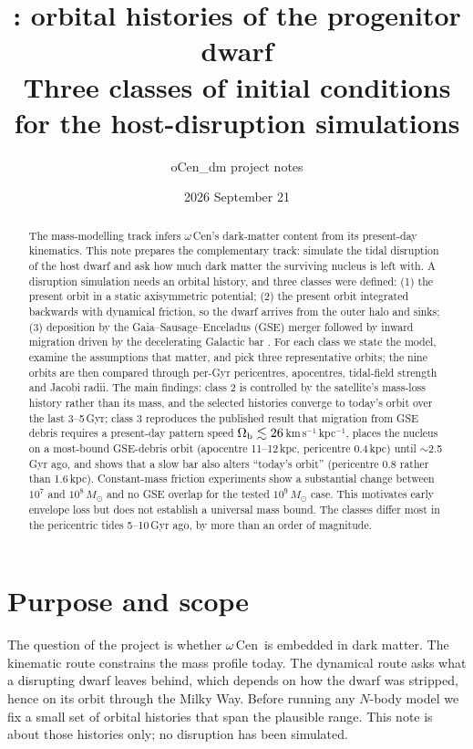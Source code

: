 \documentclass[11pt,a4paper]{article}
\title{\ocen: orbital histories of the progenitor dwarf\\ \large Three classes of initial conditions for the host-disruption simulations}
\author{oCen\_dm project notes}
\date{2026 September 21}
\newcommand{\kmskpc}{km\,s$^{-1}$\,kpc$^{-1}$}
\newcommand{\ocen}{$\omega$\,Cen}
\newcommand{\Msun}{M_\odot}
\newcommand{\Ob}{\Omega_{\rm b}}
\begin{document}
\maketitle

\begin{abstract}
The mass-modelling track infers \ocen's dark-matter content from its present-day kinematics.
This note prepares the complementary track: simulate the tidal disruption of the host dwarf and
ask how much dark matter the surviving nucleus is left with. A disruption simulation needs an
orbital history, and three classes were defined: (1) the present orbit in a static
axisymmetric potential; (2) the present orbit integrated backwards with dynamical friction, so
the dwarf arrives from the outer halo and sinks; (3) deposition by the Gaia--Sausage--Enceladus
(GSE) merger followed by inward migration driven by the decelerating Galactic bar
\citep{dillamore2026}. For each class we state the model, examine the assumptions that matter,
and pick three representative orbits; the nine orbits are then compared through per-Gyr
pericentres, apocentres, tidal-field strength and Jacobi radii. The main findings: class 2 is
controlled by the satellite's mass-loss history rather than its mass, and the selected histories
converge to today's orbit over the last 3--5\,Gyr; class 3 reproduces the published result
that migration from GSE debris requires a present-day pattern speed $\Ob \lesssim 26$\,\kmskpc,
places the nucleus on a most-bound GSE-debris orbit (apocentre 11--12\,kpc, pericentre
0.4\,kpc) until $\sim$2.5\,Gyr ago, and shows that a slow bar also alters ``today's orbit''
(pericentre 0.8 rather than 1.6\,kpc). Constant-mass friction experiments show a substantial change between
$10^7$ and $10^8\,\Msun$ and no GSE overlap for the tested $10^9\,\Msun$ case.
This motivates early envelope loss but does not establish a universal mass bound. The classes differ most in the pericentric tides
5--10\,Gyr ago, by more than an order of magnitude.
\end{abstract}

\section{Purpose and scope}

The question of the project is whether \ocen\ is embedded in dark matter. The kinematic route
constrains the mass profile today. The dynamical route asks what a disrupting dwarf leaves
behind, which depends on how the dwarf was stripped, hence on its orbit through the Milky Way.
Before running any $N$-body model we fix a small set of orbital histories that span the
plausible range. This note is about those histories only; no disruption has been simulated.
\end{document}
